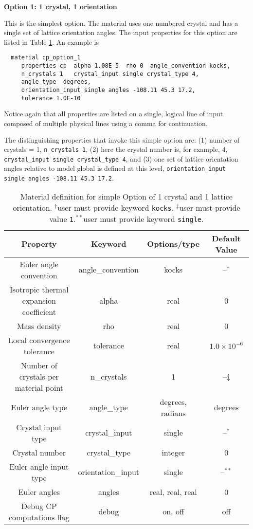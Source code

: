 \documentclass[11pt]{report}
\numberwithin{equation}{section}
\newcommand{\ttt} {\texttt}  %
\newcommand{\noi}{\noindent}
\begin{document}
\noi \textbf {Option 1: 1 crystal, 1 orientation} 

\noi This is the simplest option. The material uses one numbered crystal and has
a single set of lattice orientation angles. The input properties for this option are listed
in Table \ref{tab:mat-props-simple}.  An example is

\small
\begin{verbatim}
  material cp_option_1
     properties cp  alpha 1.08E-5  rho 0  angle_convention kocks,
     n_crystals 1   crystal_input single crystal_type 4,
     angle_type  degrees,
     orientation_input single angles -108.11 45.3 17.2,
     tolerance 1.0E-10
\end{verbatim}
\normalsize

\noi Notice again that all properties are listed on a single, logical line of input composed
of multiple physical lines using a comma for continuation.

The distinguishing properties  that invoke this simple option are: (1) number 
of crystals = 1, \small \ttt{n\_crystals 1}\normalsize, (2) here the crystal number is, for example, 4,
 \small \ttt{crystal\_input  single  crystal\_type 4}\normalsize, and (3) one set of lattice orientation angles 
 relative to model global is defined at this level, \small
 \ttt{orientation\_input single angles -108.11 45.3 17.2}\normalsize.


\begin{table}[htb]
\small
\centering
\setlength{\extrarowheight}{3pt}
\begin{tabular}{|c|c|c|c|}
\hline 
Property & Keyword & Options/type&Default Value\tabularnewline
\hline \hline
Euler angle convention & angle\_convention & kocks& --$^\dag$\tabularnewline \hline
Isotropic thermal expansion coefficient & alpha & real&0\tabularnewline \hline
Mass density & rho & real&0\tabularnewline \hline
Local convergence tolerance & tolerance & real&$1.0\times 10^{-6}$\tabularnewline \hline
Number of crystals per material point & n\_crystals & 1&--$\ddag$\tabularnewline \hline
Euler angle type & angle\_type & degrees, radians&degrees\tabularnewline \hline
Crystal input type & crystal\_input & single&--$^*$\tabularnewline \hline
Crystal number  & crystal\_type & integer&0\tabularnewline \hline
Euler angle input type & orientation\_input & single&--$^{**}$\tabularnewline \hline
Euler angles & angles & real, real, real&0\tabularnewline \hline
Debug CP computations flag & debug & on, off&off\tabularnewline
\hline 
\end{tabular}
\caption{Material definition for simple Option of 1 crystal and 1 
lattice orientation. $^\dag$user must provide keyword \ttt{kocks}.
$^\ddag$user must provide value \ttt{1}.$^{**}$user must provide keyword \ttt{single}.
\label{tab:mat-props-simple}}
\normalsize
\end{table}
\end{document}
